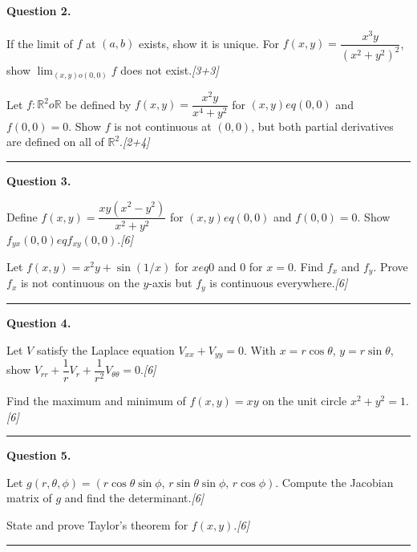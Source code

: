 \documentclass[11pt,a4paper]{article}
\newcommand{\pts}[1]{\hfill   \textit{[#1]}}
\begin{document}
\medskip


\noindent   \textbf{Question 2.}

\begin{parts}
  \item If the limit of $f$ at $(a,b)$ exists, show it is unique. For $f(x,y)=\dfrac{x^3y}{(x^2+y^2)^2}$, show $\lim_{(x,y) o(0,0)}f$ does not exist.\pts{3+3}
  \item Let $f:\mathbb{R}^2 o\mathbb{R}$ be defined by $f(x,y)=\dfrac{x^2y}{x^4+y^2}$ for $(x,y)
eq(0,0)$ and $f(0,0)=0$. Show $f$ is not continuous at $(0,0)$, but both partial derivatives are defined on all of $\mathbb{R}^2$.\pts{2+4}
\end{parts}
\medskip\rule{\linewidth}{0.2pt}

\medskip


\noindent   \textbf{Question 3.}

\begin{parts}
  \item Define $f(x,y)=\dfrac{xy(x^2-y^2)}{x^2+y^2}$ for $(x,y)
eq(0,0)$ and $f(0,0)=0$. Show $f_{yx}(0,0)
eq f_{xy}(0,0)$.\pts{6}
  \item Let $f(x,y)=x^2y+\sin(1/x)$ for $x
eq0$ and $0$ for $x=0$. Find $f_x$ and $f_y$. Prove $f_x$ is not continuous on the $y$-axis but $f_y$ is continuous everywhere.\pts{6}
\end{parts}
\medskip\rule{\linewidth}{0.2pt}

\medskip


\noindent   \textbf{Question 4.}

\begin{parts}
  \item Let $V$ satisfy the Laplace equation $V_{xx}+V_{yy}=0$. With $x=r\cos \theta$, $y=r\sin \theta$, show $V_{rr}+\dfrac{1}{r}V_r+\dfrac{1}{r^2}V_{ \theta \theta}=0$.\pts{6}
  \item Find the maximum and minimum of $f(x,y)=xy$ on the unit circle $x^2+y^2=1$.\pts{6}
\end{parts}
\medskip\rule{\linewidth}{0.2pt}

\medskip


\noindent   \textbf{Question 5.}

\begin{parts}
  \item Let $g(r, \theta,\phi)=(r\cos \theta\sin\phi,\,r\sin \theta\sin\phi,\,r\cos\phi)$. Compute the Jacobian matrix of $g$ and find the determinant.\pts{6}
  \item State and prove Taylor's theorem for $f(x,y)$.\pts{6}
\end{parts}
\medskip\rule{\linewidth}{0.2pt}
\end{document}
